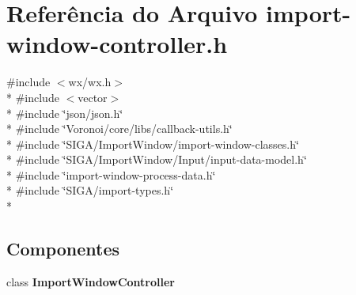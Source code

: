 \section{Referência do Arquivo import-\/window-\/controller.h}
\label{import-window-controller_8h}
{\ttfamily \#include $<$wx/wx.\+h$>$}\\*
{\ttfamily \#include $<$vector$>$}\\*
{\ttfamily \#include \char`\"{}json/json.\+h\char`\"{}}\\*
{\ttfamily \#include \char`\"{}Voronoi/core/libs/callback-\/utils.\+h\char`\"{}}\\*
{\ttfamily \#include \char`\"{}S\+I\+G\+A/\+Import\+Window/import-\/window-\/classes.\+h\char`\"{}}\\*
{\ttfamily \#include \char`\"{}S\+I\+G\+A/\+Import\+Window/\+Input/input-\/data-\/model.\+h\char`\"{}}\\*
{\ttfamily \#include \char`\"{}import-\/window-\/process-\/data.\+h\char`\"{}}\\*
{\ttfamily \#include \char`\"{}S\+I\+G\+A/import-\/types.\+h\char`\"{}}\\*
\subsection*{Componentes}
\begin{DoxyCompactItemize}
\item 
class {\bf Import\+Window\+Controller}
\end{DoxyCompactItemize}
